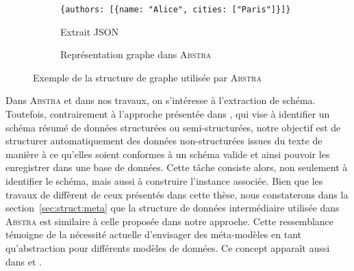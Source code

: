 \begin{figure}[htb]
    \centering
    \begin{subfigure}{.6\linewidth}
        \centering
        \begin{adjustbox}{max width=\linewidth}
            \verb|{authors: [{name: "Alice", cities: ["Paris"]}]}|
        \end{adjustbox}
        \caption{Extrait JSON}
    \end{subfigure}
    \begin{subfigure}{.6\linewidth}
        \centering
        \begin{adjustbox}{max width=\linewidth}
        \end{adjustbox}
        \caption{Représentation graphe dans \textsc{Abstra}}
    \end{subfigure}
    \caption[Exemple de la structure de graphe utilisée par \textsc{Abstra}]{Exemple de la structure de graphe utilisée par \textsc{Abstra} \cite{barretAbstraGenericAbstractions2022}}
    \label{fig:struct:abstra-ex}
\end{figure}

Dans \textsc{Abstra} et dans nos travaux, on s'intéresse à l'extraction de schéma.
Toutefois, contrairement à l'approche présentée dans \cite{barretAbstraGenericAbstractions2022}, qui vise à identifier un schéma résumé de données structurées ou semi-structurées, notre objectif est de structurer automatiquement des données non-structurées issues du texte de manière à ce qu'elles soient conformes à un schéma valide et ainsi pouvoir les enregistrer dans une base de données.
Cette tâche consiste alors, non seulement à identifier le schéma, mais aussi à construire l'instance associée.
Bien que les travaux de \cite{barretAbstraGenericAbstractions2022} diffèrent de ceux présentés dans cette thèse, nous constaterons dans la section~\ref{sec:struct:meta} que la structure de données intermédiaire utilisée dans \textsc{Abstra} est similaire à celle proposée dans notre approche.
Cette ressemblance témoigne de la nécessité actuelle d'envisager des méta-modèles en tant qu'abstraction pour différents modèles de données.
Ce concept apparaît aussi dans \cite{gonzalezlopezdemurillasConnectingDatabasesProcess2019} et \cite{maliFACTDMFrameworkAutomated2024}.
